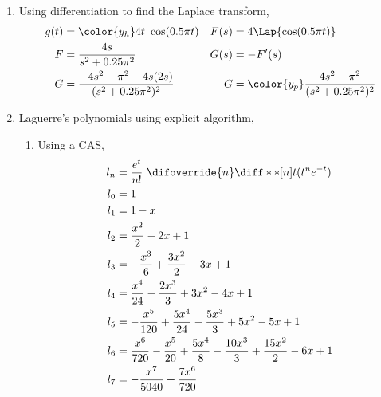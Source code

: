\begin{enumerate}
    \item Using differentiation to find the Laplace transform,
          \begin{align}
              g(t) & = \color{y_h} 4t\ \cos(0.5\pi t)                       &
              F(s) & = 4\Lap\{ \cos(0.5 \pi t) \}                             \\
              F    & = \frac{4s}{s^2 + 0.25\pi^2}                           &
              G(s) & = -F'(s)                                                 \\
              G    & = \frac{-4s^2 - \pi^2 + 4s(2s)}{(s^2 + 0.25\pi^2)^2}   &
              G    & = \color{y_p} \frac{4s^2 - \pi^2}{(s^2 + 0.25\pi^2)^2}
          \end{align}

    \item Laguerre's polynomials using explicit algorithm,
          \begin{enumerate}
              \item Using a CAS,
                    \begin{align}
                        l_n    & = \frac{e^t}{n!}\ \difoverride{n}
                        \diff**[n]{t}{(t^n e^{-t})}                                \\
                        l_0    & = 1                                               \\
                        l_1    & = 1 - x                                           \\
                        l_2    & = \frac{x^{2}}{2} - 2 x + 1                       \\
                        l_3    & = - \frac{x^{3}}{6} + \frac{3 x^{2}}{2} - 3 x + 1 \\
                        l_4    & = \frac{x^{4}}{24} - \frac{2 x^{3}}{3} + 3 x^{2}
                        - 4 x + 1                                                  \\
                        l_5    & = - \frac{x^{5}}{120} + \frac{5 x^{4}}{24}
                        - \frac{5 x^{3}}{3} + 5 x^{2} - 5 x + 1                    \\
                        l_6    & = \frac{x^{6}}{720} - \frac{x^{5}}{20}
                        + \frac{5 x^{4}}{8} - \frac{10 x^{3}}{3} + \frac{15 x^{2}}{2}
                        - 6 x + 1                                                  \\
                        l_7    & = - \frac{x^{7}}{5040} + \frac{7 x^{6}}{720}

\end{align}
\end{enumerate}
\end{enumerate}

